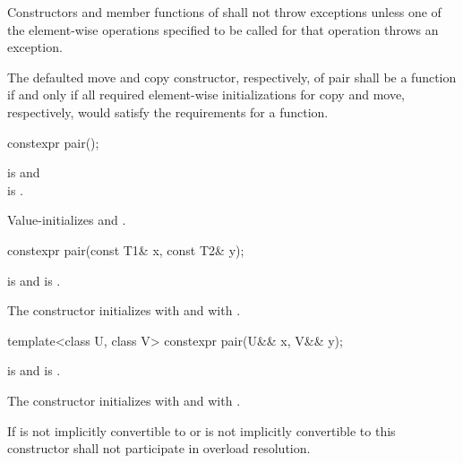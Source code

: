 \pnum
Constructors and member functions of  shall not throw exceptions unless one of
the element-wise operations specified to be called for that operation
throws an exception.

\pnum
The defaulted move and copy constructor, respectively, of pair shall
be a  function if and only if all required element-wise
initializations for copy and move, respectively, would satisfy the
requirements for a  function.

\begin{itemdecl}
constexpr pair();
\end{itemdecl}

\begin{itemdescr}
\pnum
\requires {} is 
and \\ is .

\pnum
\effects
Value-initializes  and .
\end{itemdescr}

\begin{itemdecl}
constexpr pair(const T1& x, const T2& y);
\end{itemdecl}

\begin{itemdescr}
\pnum
\requires {} is 
and  is .

\pnum
\effects
The constructor initializes  with  and 
with .
\end{itemdescr}

\begin{itemdecl}
template<class U, class V> constexpr pair(U&& x, V&& y);
\end{itemdecl}

\begin{itemdescr}
\pnum
\requires {} is 
and  is .

\pnum
\effects
The constructor initializes  with
 and 
with .

\pnum
\notes
If  is not implicitly convertible to  or  is not
implicitly convertible to  this constructor shall not participate in
overload resolution.
\end{itemdescr}

